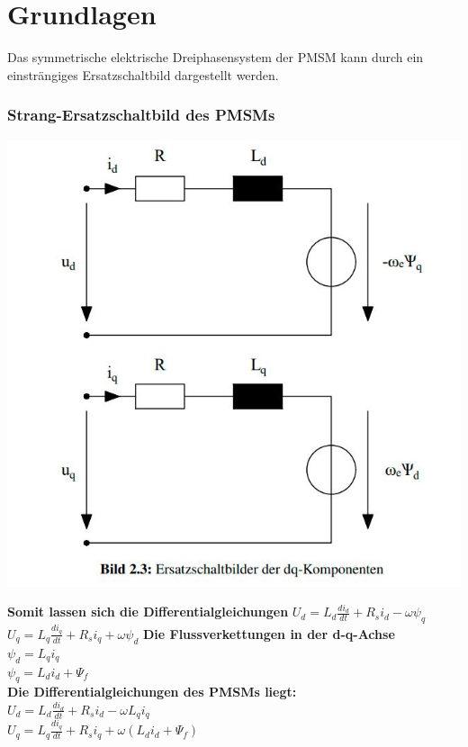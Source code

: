 \documentclass[serif,11pt, xcolor=table]{beamer}
\begin{document}
\section{Grundlagen}
\begin{frame}
\tiny{Das symmetrische elektrische Dreiphasensystem der PMSM kann durch ein einsträngiges Ersatzschaltbild dargestellt werden.} 
	\frametitle{Strang-Ersatzschaltbild des PMSMs}
	\begin{floatingfigure}[r]{0.38\linewidth}
		\includegraphics[scale=0.30]{Abbildungen/ESB.JPG}
		
	\end{floatingfigure}
	\vskip 0.2cm
	\textbf{Somit lassen sich die Differentialgleichungen}
	\vskip 0.2cm
	$U_{d}=L_{d}\frac{di_{d}}{dt}+R_{s}i_{d}-\omega \psi_{q}$
	\vskip 0.2cm
	$U_{q}=L_{q}\frac{di_{q}}{dt}+R_{s}i_{q}+\omega \psi_{d} $
	\vskip 0.2cm
	\textbf{Die Flussverkettungen in der d-q-Achse }\\
	\vskip 0.2cm
	$ \psi_{d}=L_{q}i_{q} $\\
	\vskip 0.2cm
	$ \psi_{q}=L_{d}i_{d}+\Psi_{f} $\\
	\vskip 0.2cm
	\textbf{Die Differentialgleichungen des PMSMs liegt: }\\
	\vskip 0.2cm
	$U_{d}=L_{d}\frac{di_{d}}{dt}+R_{s}i_{d}-\omega
	 L_{q}i_{q}$\\
	 \vskip 0.2cm
	$U_{q}=L_{q}\frac{di_{q}}{dt}+R_{s}i_{q}+\omega (L_{d}i_{d}+\Psi_{f})$
	
	
\end{frame}
\end{document}
